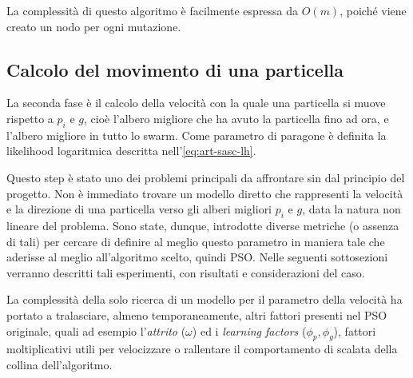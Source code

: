 La complessità di questo algoritmo è facilmente espressa da $O(m)$, poiché viene creato un nodo per ogni mutazione.

\subsection{Calcolo del movimento di una particella}
\label{chap:pso-adapt-calculate}
La seconda fase è il calcolo della velocità con la quale una particella si muove rispetto a $p_i$ e $g$, cioè l'albero migliore che ha avuto la particella fino ad ora, e l'albero migliore in tutto lo swarm. Come parametro di paragone è definita la likelihood logaritmica descritta nell'\autoref{eq:art-sasc-lh}.

Questo step è stato uno dei problemi principali da affrontare sin dal principio del progetto. Non è immediato trovare un modello diretto che rappresenti la velocità e la direzione di una particella verso gli alberi migliori $p_i$ e $g$, data la natura non lineare del problema. Sono state, dunque, introdotte diverse metriche (o assenza di tali) per cercare di definire al meglio questo parametro in maniera tale che aderisse al meglio all'algoritmo scelto, quindi PSO. Nelle seguenti sottosezioni verranno descritti tali esperimenti, con risultati e considerazioni del caso.

La complessità della solo ricerca di un modello per il parametro della velocità ha portato a tralasciare, almeno temporaneamente, altri fattori presenti nel PSO originale, quali ad esempio l'\textit{attrito} ($\omega$) ed i \textit{learning factors} ($\phi_p, \phi_g$), fattori moltiplicativi utili per velocizzare o rallentare il comportamento di scalata della collina dell'algoritmo.

